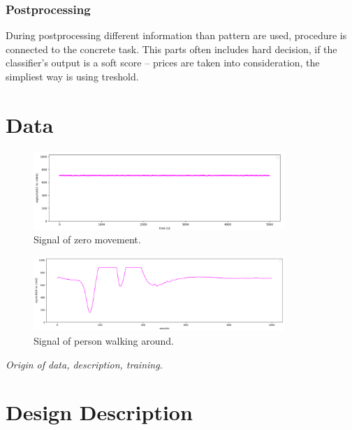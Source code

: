 \subsection*{Postprocessing}
During postprocessing different information than pattern are used, procedure is
connected to the concrete task. This parts often includes hard decision, if the
classifier's output is a soft score -- prices are taken into consideration,
the simpliest way is using treshold.



\chapter{Data}

\begin{figure}[h!]
\begin{center}
\includegraphics[width=0.85\textwidth]{obrazky-figures/signal_calm.png}
\caption{Signal of zero movement.\label{fig:signalcalm}}
\end{center}
\end{figure}

\begin{figure}[h!]
\begin{center}
\includegraphics[width=0.85\textwidth]{obrazky-figures/signal_walk.png}
\caption{Signal of person walking around.\label{fig:signalcalm}}
\end{center}
\end{figure}

{\it Origin of data, description, training.}




\chapter{Design Description}

